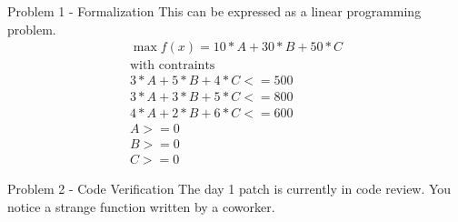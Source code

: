 \documentclass{beamer}
\begin{document}
\begin{frame}{Problem 1 - Formalization}
This can be expressed as a linear programming problem.  
\begin{align}
\max f(x) = 10 * A + 30 * B + 50 * C \\
\text{with contraints}\\
3*A + 5*B+ 4*C <= 500 \\
3*A + 3*B + 5*C <= 800 \\
4*A + 2*B + 6*C <= 600 \\
A>=0 \\
B>=0 \\
C>=0
\end{align}
\end{frame}

\begin{frame}{Problem 2 - Code Verification}
The day 1 patch is currently in code review. You notice a strange function written by a coworker.



\end{frame}
\end{document}
